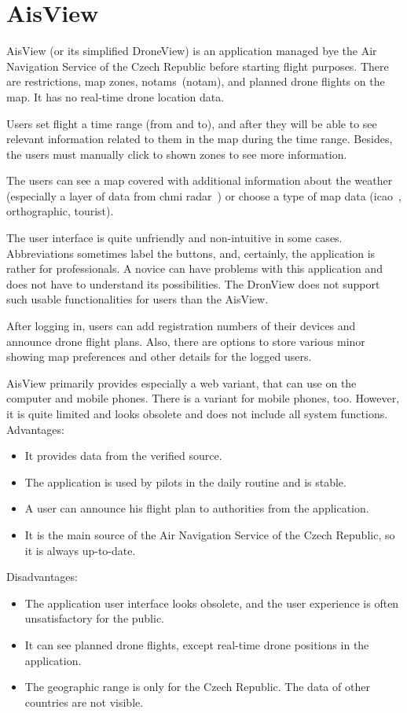 \section{AisView}\label{sec:aisview}
AisView (or its simplified DroneView) is an application managed bye the Air Navigation Service of the Czech Republic before starting flight purposes.
There are restrictions, map zones, \acrshort{notam}s~(\acrlong{notam}), and planned drone flights on the map.
It has no real-time drone location data.

Users set flight a time range (from and to), and after they will be able to see relevant information related to them in the map during the time range.
Besides, the users must manually click to shown zones to see more information.

The users can see a map covered with additional information about the weather (especially a layer of data from \acrshort{chmi} radar~\cite{chmi}) or choose a type of map data (\acrshort{icao}~\cite{icao}, orthographic, tourist).

The user interface is quite unfriendly and non-intuitive in some cases.
Abbreviations sometimes label the buttons, and, certainly, the application is rather for professionals.
A novice can have problems with this application and does not have to understand its possibilities.
The DronView does not support such usable functionalities for users than the AisView.

After logging in, users can add registration numbers of their devices and announce drone flight plans.
Also, there are options to store various minor showing map preferences and other details for the logged users.

AisView primarily provides especially a web variant, that can use on the computer and mobile phones.
There is a variant for mobile phones, too.
However, it is quite limited and looks obsolete and does not include all system functions.
\newline
\newline
Advantages:
\begin{itemize}
    \item It provides data from the verified source.
    \item The application is used by pilots in the daily routine and is stable.
    \item A user can announce his flight plan to authorities from the application.
    \item It is the main source of the Air Navigation Service of the Czech Republic, so it is always up-to-date.
\end{itemize}
Disadvantages:
\begin{itemize}
    \item The application user interface looks obsolete, and the user experience is often unsatisfactory for the public.
    \item It can see planned drone flights, except real-time drone positions in the application.
    \item The geographic range is only for the Czech Republic.
    The data of other countries are not visible.
\end{itemize}

